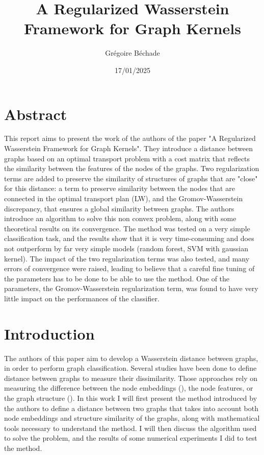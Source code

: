 \documentclass[a4paper,11pt]{article}
\begin{document}
\title{A Regularized Wasserstein Framework for Graph Kernels}
\author{Grégoire Béchade}
\date{17/01/2025}
\maketitle

\section{Abstract}

This report aims to present the work of the authors of the paper "A Regularized Wasserstein Framework for Graph Kernels".
They introduce a distance between graphs based on an optimal transport problem with a cost matrix that reflects the similarity between the features of the nodes of the graphs. 
Two regularization terms are added to preserve the similarity of structures of graphs that are "close" for this distance: a term to preserve similarity between the nodes that are connected in the optimal transport plan (LW), and the Gromov-Wasserstein discrepancy, that ensures a global similarity between graphs. 
The authors introduce an algorithm to solve this non convex problem, along with some theoretical results on its convergence. 
The method was tested on a very simple classification task, and the results show that it is very time-consuming and does not outperform by far very simple models (random forest, SVM with gaussian kernel). 
The impact of the two regularization terms was also tested, and many errors of convergence were raised, leading to believe that a careful fine tuning of the parameters has to be done to be able to use the method.
One of the parameters, the Gromov-Wasserstein regularization term, was found to have very little impact on the performances of the classifier.

\section{Introduction}


The authors of this paper aim to develop a Wasserstein distance between graphs, in order to perform graph classification. 
Several studies have been done to define distance between graphs to measure their dissimilarity. 
Those approaches rely on measuring the difference between the node embeddings (\cite{nikolentzos2017matching}), the node features, or the graph structure (\cite{titouan2019optimal}).
In this work I will first present the method introduced by the authors to define a distance between two graphs that takes into account both node embeddings and structure similarity of the graphs, along with mathematical tools necessary to understand the method.
I will then discuss the algorithm used to solve the problem, and the results of some numerical experiments I did to test the method. 
\end{document}
